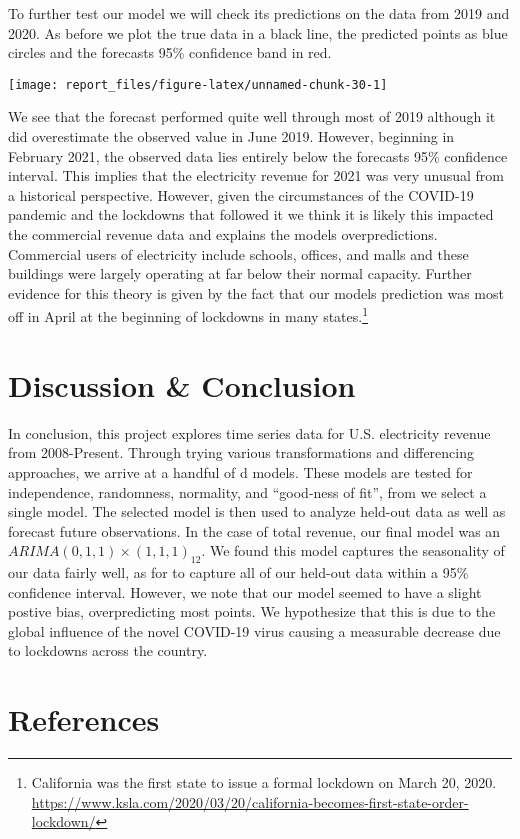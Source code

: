 \documentclass[
]{article}
\begin{document}
To further test our model we will check its predictions on the data from
2019 and 2020. As before we plot the true data in a black line, the
predicted points as blue circles and the forecasts 95\% confidence band
in red.

\begin{center}\texttt{[image: report\_files/figure-latex/unnamed-chunk-30-1]} \end{center}

We see that the forecast performed quite well through most of 2019
although it did overestimate the observed value in June 2019. However,
beginning in February 2021, the observed data lies entirely below the
forecasts 95\% confidence interval. This implies that the electricity
revenue for 2021 was very unusual from a historical perspective.
However, given the circumstances of the COVID-19 pandemic and the
lockdowns that followed it we think it is likely this impacted the
commercial revenue data and explains the models overpredictions.
Commercial users of electricity include schools, offices, and malls and
these buildings were largely operating at far below their normal
capacity. Further evidence for this theory is given by the fact that our
models prediction was most off in April at the beginning of lockdowns in
many
states.\footnote{California was the first state to issue a formal lockdown on March 20, 2020. \url{https://www.ksla.com/2020/03/20/california-becomes-first-state-order-lockdown/}}

\section{Discussion & Conclusion}

In conclusion, this project explores time series data for U.S.
electricity revenue from 2008-Present. Through trying various
transformations and differencing approaches, we arrive at a handful of d
models. These models are tested for independence, randomness, normality,
and ``good-ness of fit'', from we select a single model. The selected
model is then used to analyze held-out data as well as forecast future
observations. In the case of total revenue, our final model was an
\(ARIMA(0,1,1)\times (1,1,1)_12\). We found this model captures the
seasonality of our data fairly well, as for to capture all of our
held-out data within a 95\% confidence interval. However, we note that
our model seemed to have a slight postive bias, overpredicting most
points. We hypothesize that this is due to the global influence of the
novel COVID-19 virus causing a measurable decrease due to lockdowns
across the country.

\section{References}
\end{document}
